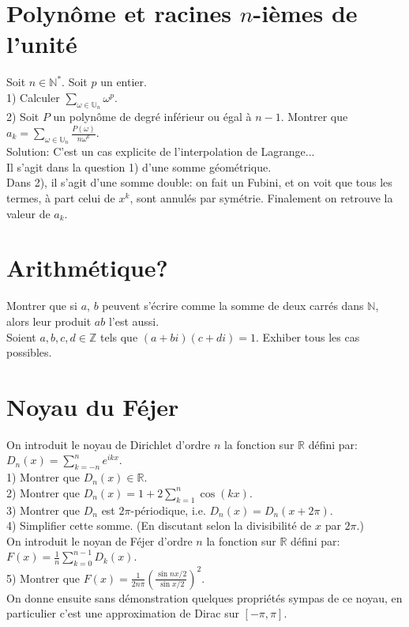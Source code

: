 \documentclass{article}
\begin{document}
\section{Polyn\^ome et racines $n$-i\`emes de l'unit\'e}
Soit $n\in\mathbb{N^*}$. Soit $p$ un entier.\\
1) Calculer $\sum\limits_{\omega\in\mathbb{U}_n}\omega^p$.\\
2) Soit $P$ un polyn\^ome de degr\'e inf\'erieur ou \'egal \`a $n-1$. Montrer que $a_k=\sum\limits_{\omega\in\mathbb{U}_n}\frac{P(\omega)}{n\omega^k}$.\\
Solution: C'est un cas explicite de l'interpolation de Lagrange...\\
Il s'agit dans la question 1) d'une somme g\'eom\'etrique.\\
Dans 2), il s'agit d'une somme double: on fait un Fubini, et on voit que tous les termes, \`a part celui de $x^k$, sont annul\'es par sym\'etrie. Finalement on retrouve la valeur de $a_k$.

\section{Arithm\'etique?}
Montrer que si $a$, $b$ peuvent s'\'ecrire comme la somme de deux carr\'es dans $\mathbb{N}$, alors leur produit $ab$ l'est aussi.\\
Soient $a,b,c,d\in\mathbb{Z}$ tels que $(a+bi)(c+di)=1$. Exhiber tous les cas possibles.

\section{Noyau du F\'ejer}
On introduit le noyau de Dirichlet d'ordre $n$ la fonction sur $\mathbb{R}$ d\'efini par: $D_n(x)=\sum\limits_{k=-n}^{n}e^{ikx}$.\\
1) Montrer que $D_n(x)\in\mathbb{R}$.\\
2) Montrer que $D_n(x)=1+2\sum\limits_{k=1}^{n}\cos(kx)$.\\
3) Montrer que $D_n$ est $2\pi$-p\'eriodique, i.e. $D_n(x)=D_n(x+2\pi)$.\\
4) Simplifier cette somme. (En discutant selon la divisibilit\'e de $x$ par $2\pi$.)\\
On introduit le noyan de F\'ejer d'ordre $n$ la fonction sur $\mathbb{R}$ d\'efini par: $F(x)=\frac{1}{n}\sum\limits_{k=0}^{n-1}D_k(x)$.\\
5) Montrer que $F(x)=\frac{1}{2n\pi}(\frac{\sin nx/2}{\sin x/2})^2$.\\
On donne ensuite sans d\'emonstration quelques propri\'et\'es sympas de ce noyau, en particulier c'est une approximation de Dirac sur $[-\pi,\pi]$.
\end{document}
